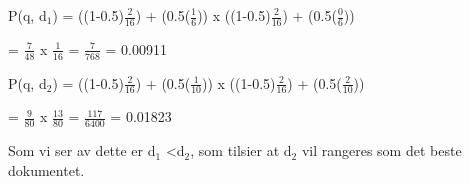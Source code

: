 \vspace{2mm}

P(q, d$_{1}$) = ((1-0.5)$\frac{2}{16}$) + (0.5($\frac{1}{6}$))  x  ((1-0.5)$\frac{2}{16}$) + (0.5($\frac{0}{6}$))

\vspace{2mm}

\hspace{8.4ex} = $\frac{7}{48}$  x  $\frac{1}{16}$   =   $\frac{7}{768}$  =  0.00911  

\vspace{4mm}

P(q, d$_{2}$) = ((1-0.5)$\frac{2}{16}$) + (0.5($\frac{1}{10}$))  x  ((1-0.5)$\frac{2}{16}$) + (0.5($\frac{2}{10}$))

\vspace{2mm}

\hspace{8.4ex} = $\frac{9}{80}$  x  $\frac{13}{80}$   =   $\frac{117}{6400}$  =  0.01823  

\vspace{2mm} 

\noindent Som vi ser av dette er d$_{1}$ \textless  d$_{2}$, som tilsier at d$_{2}$ vil rangeres som det beste dokumentet. 

\pagebreak
